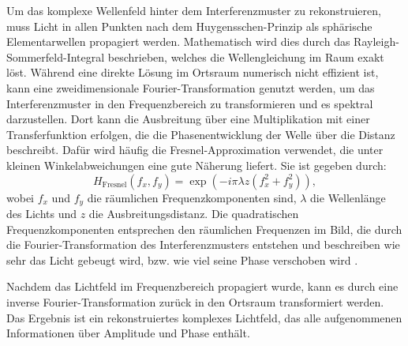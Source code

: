 \documentclass[10pt,twocolumn,a4paper]{article}
\begin{document}
Um das komplexe Wellenfeld hinter dem Interferenzmuster zu rekonstruieren, muss Licht in allen Punkten nach dem Huygensschen-Prinzip als sphärische Elementarwellen propagiert werden. Mathematisch wird dies durch das Rayleigh-Sommerfeld-Integral beschrieben, welches die Wellengleichung im Raum exakt löst. Während eine direkte Lösung im Ortsraum numerisch nicht effizient ist, kann eine zweidimensionale Fourier-Transformation genutzt werden, um das Interferenzmuster in den Frequenzbereich zu transformieren und es spektral darzustellen. Dort kann die Ausbreitung über eine Multiplikation mit einer Transferfunktion erfolgen, die die Phasenentwicklung der Welle über die Distanz beschreibt. Dafür wird häufig die Fresnel-Approximation verwendet, die unter kleinen Winkelabweichungen eine gute Näherung liefert. Sie ist gegeben durch:
\begin{equation}
    H_{\text{Fresnel}}(f_x, f_y) = \exp\left(-i \pi \lambda z \left( f_x^2 + f_y^2 \right)\right),
    \label{eq:fesnel}
\end{equation}
wobei $f_x$ und $f_y$ die räumlichen Frequenzkomponenten sind, $\lambda$ die Wellenlänge des Lichts und $z$ die Ausbreitungsdistanz. Die quadratischen Frequenzkomponenten entsprechen den räumlichen Frequenzen im Bild, die durch die Fourier-Transformation des Interferenzmusters entstehen und beschreiben wie sehr das Licht gebeugt wird, bzw. wie viel seine Phase verschoben wird \cite{DH}. 

Nachdem das Lichtfeld im Frequenzbereich propagiert wurde, kann es durch eine inverse Fourier-Transformation zurück in den Ortsraum transformiert werden. Das Ergebnis ist ein rekonstruiertes komplexes Lichtfeld, das alle aufgenommenen Informationen über Amplitude und Phase enthält.
\end{document}
